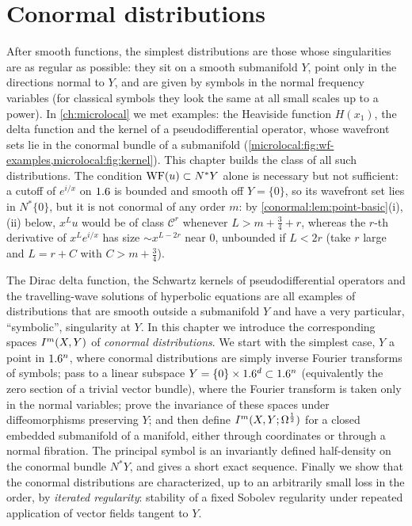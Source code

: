 \chapter{Conormal distributions}\label{ch:conormal}
\providecommand{\osc}[1]{\mathcal{I}[#1]}
\providecommand{\IH}[1]{IH^{#1}}
\providecommand{\Vt}{\mathcal{V}}
\providecommand{\Ffib}{\mathcal{F}_{\mathrm{fib}}}

After smooth functions, the simplest distributions are those whose
singularities are as regular as possible: they sit on a smooth submanifold
$Y$, point only in the directions normal to $Y$, and are given by symbols in
the normal frequency variables (for classical symbols they look the same at
all small scales up to a power). In \cref{ch:microlocal} we met examples: the
Heaviside function $H(x_1)$, the delta function and the kernel of a
pseudodifferential operator, whose wavefront sets lie in the conormal bundle
of a submanifold (\cref{microlocal:fig:wf-examples,microlocal:fig:kernel}).
This chapter builds the class of all such distributions. The condition
$\operatorname{WF}(u)\subset N^*Y$ alone is necessary but not sufficient: a cutoff of
$e^{i/x}$ on $1.6$ is bounded and smooth off $Y=\{0\}$, so its wavefront set
lies in $N^*\{0\}$, but it is not conormal of any order $m$: by
\cref{conormal:lem:point-basic}(i),(ii) below, $x^Lu$ would be of class
$\mathcal C^r$ whenever $L>m+\frac34+r$, whereas the $r$-th derivative of
$x^Le^{i/x}$ has size $\sim x^{L-2r}$ near $0$, unbounded if $L<2r$ (take $r$
large and $L=r+C$ with $C>m+\frac34$).

The Dirac delta function, the Schwartz kernels of pseudodifferential operators
and the travelling-wave solutions of hyperbolic equations are all examples of
distributions that are smooth outside a submanifold $Y$ and have a very
particular, ``symbolic'', singularity at $Y$.  In this chapter we introduce the
corresponding spaces $I^{m}(X,Y)$ of \emph{conormal distributions}.  We start
with the simplest case, $Y$ a point in $1.6^n$, where conormal distributions are
simply inverse Fourier transforms of symbols; pass to a linear subspace
$Y=\{0\}\times1.6^d\subset1.6^n$ (equivalently the zero section of a trivial
vector bundle), where the Fourier transform is taken only in the normal
variables; prove the invariance of these spaces under diffeomorphisms preserving
$Y$; and then define $I^{m}(X,Y;\Omega^{\frac12})$ for a closed embedded submanifold of
a manifold, either through coordinates or through a normal fibration.  The
principal symbol is an invariantly defined half-density on the conormal bundle
$N^*Y$, and gives a short exact sequence.  Finally we show that the conormal
distributions are characterized, up to an arbitrarily small loss in the order,
by \emph{iterated regularity}: stability of a fixed Sobolev regularity under
repeated application of vector fields tangent to $Y$.

